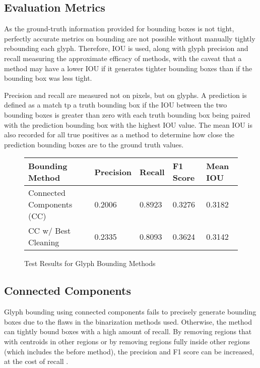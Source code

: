 \subsection{Evaluation Metrics}

As the ground-truth information provided for bounding boxes is not tight, perfectly accurate metrics on bounding are not possible without manually tightly rebounding each glyph. Therefore, IOU is used, along with glyph precision and recall measuring the approximate efficacy of methods, with the caveat that a method may have a lower IOU if it generates tighter bounding boxes than if the bounding box was less tight.

Precision and recall are measured not on pixels, but on glyphs. A prediction is defined as a match tp a truth bounding box if the IOU between the two bounding boxes is greater than zero with each truth bounding box being paired with the prediction bounding box with the highest IOU value. The mean IOU is also recorded for all true positives as a method to determine how close the prediction bounding boxes are to the ground truth values.

\begin{figure}[H]
    \caption{Test Results for Glyph Bounding Methods}
    \label{fig:boundingEval}
    \centering
    \begin{tabular}{ | l | l | l | l | l | }
        \hline
        Bounding Method & Precision & Recall & F1 Score & Mean IOU \\
        \hline
        Connected Components (CC) & 0.2006 & 0.8923 & 0.3276 & 0.3182 \\
        CC w/ Best Cleaning & 0.2335 & 0.8093 & 0.3624 & 0.3142 \\
        \hline
    \end{tabular}
\end{figure}

\subsection{Connected Components}

Glyph bounding using connected components fails to precisely generate bounding boxes due to the flaws in the binarization methods used. Otherwise, the method can tightly bound boxes with a high amount of recall. By removing regions that with centroids in other regions or by removing regions fully inside other regions (which includes the before method), the precision and F1 score can be increased, at the cost of recall .

